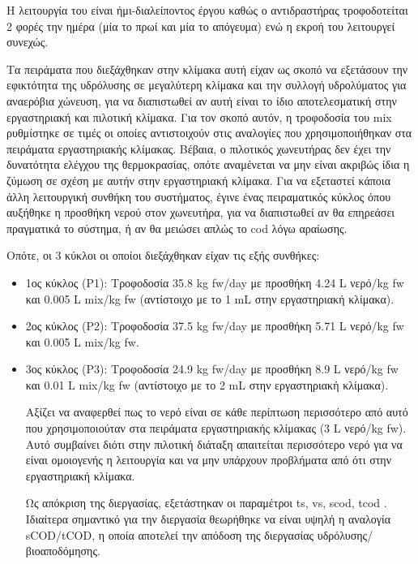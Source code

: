 \documentclass[11pt]{report}
\begin{document}
Η λειτουργία του είναι ήμι-διαλείποντος έργου καθώς ο αντιδραστήρας τροφοδοτείται 2 φορές την ημέρα (μία το πρωί και μία το απόγευμα) ενώ η εκροή του λειτουργεί συνεχώς.

Τα πειράματα που διεξάχθηκαν στην κλίμακα αυτή είχαν ως σκοπό να εξετάσουν την εφικτότητα της υδρόλυσης σε μεγαλύτερη κλίμακα και την συλλογή υδρολύματος για αναερόβια χώνευση, για να διαπιστωθεί αν αυτή είναι το ίδιο αποτελεσματική στην εργαστηριακή και πιλοτική κλίμακα. Για τον σκοπό αυτόν, η τροφοδοσία του \acrshort{mix} ρυθμίστηκε σε τιμές οι οποίες αντιστοιχούν στις αναλογίες που χρησιμοποιήθηκαν στα πειράματα εργαστηριακής κλίμακας. Βέβαια, ο πιλοτικός χωνευτήρας δεν έχει την δυνατότητα ελέγχου της θερμοκρασίας, οπότε αναμένεται να μην είναι ακριβώς ίδια η ζύμωση σε σχέση με αυτήν στην εργαστηριακή κλίμακα. Για να εξεταστεί κάποια άλλη λειτουργική συνθήκη του συστήματος, έγινε ένας πειραματικός κύκλος όπου αυξήθηκε η προσθήκη νερού στον χωνευτήρα, για να διαπιστωθεί αν θα επηρεάσει πραγματικά το σύστημα, ή αν θα μειώσει απλώς το \acrshort{cod} λόγω αραίωσης.

Οπότε, οι 3 κύκλοι οι οποίοι διεξάχθηκαν είχαν τις εξής συνθήκες:
\begin{itemize}
\item 1ος κύκλος (P1): Τροφοδοσία 35.8 kg \acrshort{fw}/day με προσθήκη 4.24 L νερό/kg \acrshort{fw} και 0.005 L \acrshort{mix}/kg \acrshort{fw} (αντίστοιχο με το 1 mL στην εργαστηριακή κλίμακα).
\item 2ος κύκλος (P2): Τροφοδοσία 37.5 kg \acrshort{fw}/day με προσθήκη 5.71 L νερό/kg \acrshort{fw} και 0.005 L \acrshort{mix}/kg \acrshort{fw}.
\item 3ος κύκλος (P3): Τροφοδοσία 24.9 kg \acrshort{fw}/day με προσθήκη 8.9 L νερό/kg \acrshort{fw} και 0.01 L \acrshort{mix}/kg \acrshort{fw} (αντίστοιχο με το 2 mL στην εργαστηριακή κλίμακα).

Αξίζει να αναφερθεί πως το νερό είναι σε κάθε περίπτωση περισσότερο από αυτό που χρησιμοποιούταν στα πειράματα εργαστηριακής κλίμακας (3 L νερό/kg \acrshort{fw}). Αυτό συμβαίνει διότι στην πιλοτική διάταξη απαιτείται περισσότερο νερό για να είναι ομοιογενής η λειτουργία και να μην υπάρχουν προβλήματα από ότι στην εργαστηριακή κλίμακα.

Ως απόκριση της διεργασίας, εξετάστηκαν οι παραμέτροι \acrshort{ts}, \acrshort{vs}, \acrshort{scod}, \acrshort{tcod} . Ιδιαίτερα σημαντικό για την διεργασία θεωρήθηκε να είναι υψηλή η αναλογία sCOD/tCOD, η οποία αποτελεί την απόδοση της διεργασίας υδρόλυσης/βιοαποδόμησης.
\end{itemize}
\end{document}
